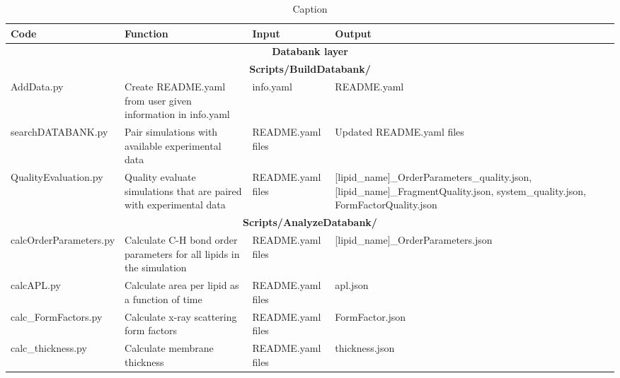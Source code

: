 \documentclass[fleqn,10pt]{wlscirep}
\begin{document}
\begin{table}[!h]
    \centering
    \begin{tabular}{p{3.0cm}  p{5.0cm}  p{3.0cm}  p{4.0cm}}
        Code & Function & Input & Output \\
        \hline
        \multicolumn{4}{c}{ {\bf Databank layer}}\\
        \hline
        \multicolumn{4}{c}{ {\bf Scripts/BuildDatabank/ }}\\
         AddData.py & Create README.yaml from user given information in info.yaml  & info.yaml & README.yaml \\
         searchDATABANK.py & Pair simulations with available experimental data  & README.yaml files & Updated README.yaml files \\
         QualityEvaluation.py & Quality evaluate simulations that are paired with experimental data  & README.yaml files & [lipid\_name]\_OrderParameters\_quality.json, [lipid\_name]\_FragmentQuality.json, system\_quality.json, FormFactorQuality.json \\
         \multicolumn{4}{c}{ {\bf Scripts/AnalyzeDatabank/ }}\\
         calcOrderParameters.py & Calculate C-H bond order parameters for all lipids in the simulation & README.yaml files & [lipid\_name]\_OrderParameters.json \\
         calcAPL.py & Calculate area per lipid as a function of time & README.yaml files & apl.json \\
         calc\_FormFactors.py & Calculate x-ray scattering form factors & README.yaml files & FormFactor.json \\
         calc\_thickness.py & Calculate membrane thickness & README.yaml files & thickness.json \\
         
         
    \end{tabular}
    \caption{Caption}
    \label{tab:my_label}
\end{table}
\end{document}
